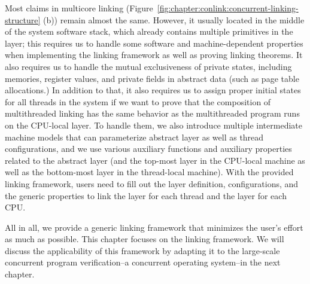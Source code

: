 Most claims in multicore linking (Figure~\ref{fig:chapter:conlink:concurrent-linking-structure} (b)) remain almost the same. 
However, it usually located in the middle of the system software stack, which already contains multiple primitives in the layer; this requires us to handle
 some  software and machine-dependent properties when implementing the linking framework as well as proving linking theorems. 
It also requires us to handle the mutual exclusiveness of 
private states, including memories, register values, and private fields in abstract data (such as page table allocations.)
In addition to that, it also requires us to assign proper initial states for all threads in the system if we want to prove that the composition of multithreaded linking has the same behavior as the multithreaded program runs on the CPU-local layer. 
To handle them, we also introduce multiple intermediate machine models that can parameterize abstract layer as well as thread configurations, and we use various auxiliary functions and auxiliary properties related to the abstract layer (and the top-most layer in the CPU-local machine as well as the bottom-most layer in the thread-local machine). 
With the provided linking framework, users need to 
fill out the layer definition, configurations, and the generic properties to link the layer for each thread and the layer for each CPU.

All in all, we provide a  generic linking framework that minimizes the user's effort as much as possible.
This chapter focuses on  the linking framework.
We will discuss the applicability of this framework by adapting it to the large-scale concurrent program verification--a concurrent operating system--in the next chapter.





